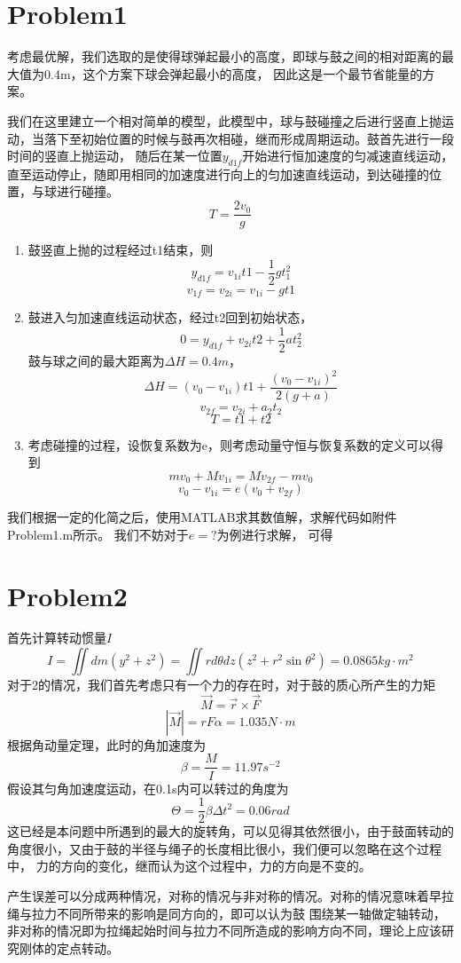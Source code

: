 \documentclass[12pt,letterpaper]{article}
\begin{document}
\section*{Problem1}
考虑最优解，我们选取的是使得球弹起最小的高度，即球与鼓之间的相对距离的最大值为0.4m，这个方案下球会弹起最小的高度，
因此这是一个最节省能量的方案。

我们在这里建立一个相对简单的模型，此模型中，球与鼓碰撞之后进行竖直上抛运动，当落下至初始位置的时候与鼓再次相碰，继而形成周期运动。鼓首先进行一段时间的竖直上抛运动，
随后在某一位置$y_{d1f}$开始进行恒加速度的匀减速直线运动，直至运动停止，随即用相同的加速度进行向上的匀加速直线运动，到达碰撞的位置，与球进行碰撞。
$$T = \frac{2v_0}{g}$$
\begin{enumerate}
    \item
    鼓竖直上抛的过程经过t1结束，则
    $$y_{d1f} = v_{1i}t1 - \frac{1}{2}g t_1^2$$
    $$v_{1f} = v_{2i} = v_{1i}-gt1$$
    \item
    鼓进入匀加速直线运动状态，经过t2回到初始状态，
    $$0 = y_{d1f} + v_{2i}t2 + \frac{1}{2}a t_2^2$$
    鼓与球之间的最大距离为$\Delta H = 0.4m$，
    $$\Delta H = (v_0 - v_{1i})t1 + \frac{(v_0 -v_{1i})^2}{2(g+a)}$$
    $$v_{2f} = v_{2i} + a_2 t_2$$
    $$T = t1 + t2$$
    \item
    考虑碰撞的过程，设恢复系数为e，则考虑动量守恒与恢复系数的定义可以得到
    $$mv_0 + Mv_{1i} = Mv_{2f} - mv_{0}$$
    $$v_0 - v_{1i} = e(v_0 + v_{2f})$$
\end{enumerate}
我们根据一定的化简之后，使用MATLAB求其数值解，求解代码如附件Problem1.m所示。
我们不妨对于$e = ?$为例进行求解，
可得

\section*{Problem2}
首先计算转动惯量$I$
$$I = \iint dm(y^2 + z^2) = \iint  rd\theta dz (z^2 + r^2 \sin{\theta}^2) = 0.0865 kg\cdot m^2$$
对于2的情况，我们首先考虑只有一个力的存在时，对于鼓的质心所产生的力矩
$$\vec{M} = \vec{r}\times \vec{F}$$
$$|\vec{M}| = rF\alpha = 1.035 N\cdot m$$
根据角动量定理，此时的角加速度为
$$\beta = \frac{M}{I} = 11.97 s^{-2}$$
假设其匀角加速度运动，在0.1s内可以转过的角度为
$$\Theta = \frac{1}{2}\beta \Delta t^2 = 0.06 rad$$
这已经是本问题中所遇到的最大的旋转角，可以见得其依然很小，由于鼓面转动的角度很小，又由于鼓的半径与绳子的长度相比很小，我们便可以忽略在这个过程中，
力的方向的变化，继而认为这个过程中，力的方向是不变的。

产生误差可以分成两种情况，对称的情况与非对称的情况。对称的情况意味着早拉绳与拉力不同所带来的影响是同方向的，即可以认为鼓
围绕某一轴做定轴转动，非对称的情况即为拉绳起始时间与拉力不同所造成的影响方向不同，理论上应该研究刚体的定点转动。
\end{document}
